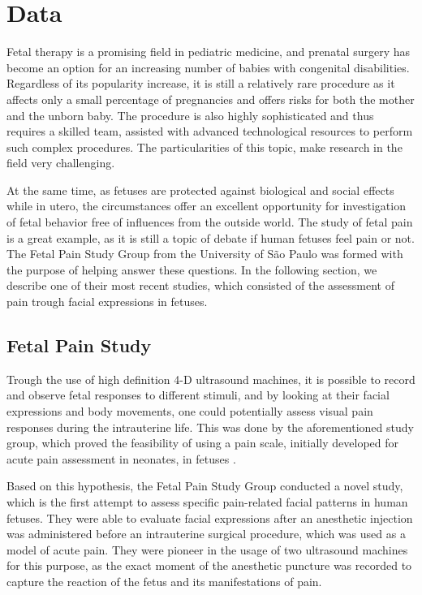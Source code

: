 \chapter{Data}

Fetal therapy is a promising field in pediatric medicine, and prenatal surgery has become an option for an increasing number of babies with congenital disabilities. Regardless of its popularity increase, it is still a relatively rare procedure as it affects only a small percentage of pregnancies and offers risks for both the mother and the unborn baby. The procedure is also highly sophisticated and thus requires a skilled team, assisted with advanced technological resources to perform such complex procedures. The particularities of this topic, make research in the field very challenging.

At the same time, as fetuses are protected against biological and social effects while in utero, the circumstances offer an excellent opportunity for investigation of fetal behavior free of influences from the outside world. The study of fetal pain is a great example, as it is still a topic of debate if human fetuses feel pain or not. The Fetal Pain Study Group from the University of São Paulo was formed with the purpose of helping answer these questions. In the following section, we describe one of their most recent studies, which consisted of the assessment of pain trough facial expressions in fetuses.

\section{Fetal Pain Study}

Trough the use of high definition 4-D ultrasound machines, it is possible to record and observe fetal responses to different stimuli, and by looking at their facial expressions and body movements, one could potentially assess visual pain responses during the intrauterine life. This was done by the aforementioned study group, which proved the feasibility of using a pain scale, initially developed for acute pain assessment in neonates, in fetuses \citep{bernardes2018feasibility}. 

Based on this hypothesis, the Fetal Pain Study Group conducted a novel study, which is the first attempt to assess specific pain-related facial patterns in human fetuses. They were able to evaluate facial expressions after an anesthetic injection was administered before an intrauterine surgical procedure, which was used as a model of acute pain. They were pioneer in the usage of two ultrasound machines for this purpose, as the exact moment of the anesthetic puncture was recorded to capture the reaction of the fetus and its manifestations of pain. 

